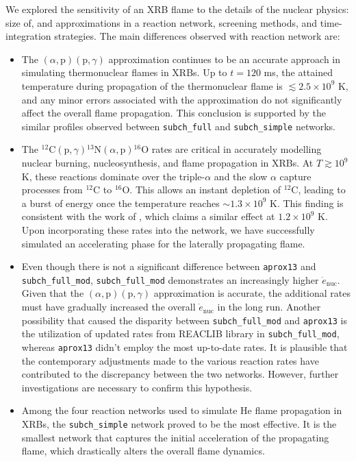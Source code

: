 \documentclass[preprint,times,tighten]{aastex631}
\begin{document}
We explored the sensitivity of an XRB flame to the details of the
nuclear physics: size of, and approximations in a reaction network, screening methods, and time-integration strategies. The main
differences observed with reaction network are:

\begin{itemize}
    \item The $(\alpha, \mbox{p})(\mbox{p}, \gamma)$ approximation continues to be an accurate approach in simulating thermonuclear flames in XRBs. Up to $t = 120$ ms, the attained temperature during propagation of the thermonuclear flame is $\lesssim 2.5 \times 10^9$ K, and any minor errors associated with the approximation do not significantly affect the overall flame propagation. This conclusion is supported by the similar profiles observed between {\tt subch\_full} and {\tt subch\_simple} networks.
    
    \item The ${}^{12}\mbox{C}(\mbox{p}, \gamma) {}^{13}\mbox{N}(\alpha, \mbox{p}){}^{16}\mbox{O}$ rates are critical in accurately modelling nuclear burning, nucleosynthesis, and flame propagation in XRBs. At $T \gtrsim 10^9$ K, these reactions dominate over the triple-$\alpha$ and the slow $\alpha$ capture processes from ${}^{12}$C to ${}^{16}$O. This allows an instant depletion of ${}^{12}$C, leading to a burst of energy once the temperature reaches $\sim 1.3 \times 10^9$ K. This finding is consistent with the work of \cite{Weinberg_2006}, which claims a similar effect at $1.2 \times 10^9$ K. Upon incorporating these rates into the network, we have successfully simulated an accelerating phase for the laterally propagating flame.

    \item Even though there is not a significant difference between {\tt aprox13} and {\tt subch\_full\_mod}, {\tt subch\_full\_mod} demonstrates an increasingly higher $\dot{e}_{\textrm{nuc}}$. Given that the $(\alpha, \mbox{p})(\mbox{p}, \gamma)$ approximation is accurate, the additional rates must have gradually increased the overall $\dot{e}_{\textrm{nuc}}$ in the long run.
    Another possibility that caused the disparity between {\tt subch\_full\_mod} and {\tt aprox13} is the utilization of updated rates from {\sf REACLIB} library in {\tt subch\_full\_mod}, whereas {\tt aprox13} didn't employ the most up-to-date rates. It is plausible that the contemporary adjustments made to the various reaction rates have contributed to the discrepancy between the two networks. However, further investigations are necessary to confirm this hypothesis.

    \item  Among the four reaction networks used to simulate He flame propagation in XRBs, the {\tt subch\_simple} network proved to be the most effective. It is the smallest network that captures the initial acceleration of the propagating flame, which drastically alters the overall flame dynamics.
    
\end{itemize}
\end{document}
